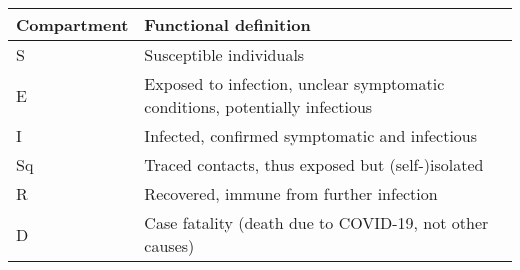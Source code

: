 \documentclass[]{article}
\begin{document}
\begin{longtable}[]{@{}ll@{}}
\toprule
\begin{minipage}[b]{0.11\columnwidth}\raggedright
Compartment\strut
\end{minipage} & \begin{minipage}[b]{0.83\columnwidth}\raggedright
Functional definition\strut
\end{minipage}\tabularnewline
\midrule
\endhead
\begin{minipage}[t]{0.11\columnwidth}\raggedright
S\strut
\end{minipage} & \begin{minipage}[t]{0.83\columnwidth}\raggedright
Susceptible individuals\strut
\end{minipage}\tabularnewline
\begin{minipage}[t]{0.11\columnwidth}\raggedright
E\strut
\end{minipage} & \begin{minipage}[t]{0.83\columnwidth}\raggedright
Exposed to infection, unclear symptomatic conditions, potentially
infectious\strut
\end{minipage}\tabularnewline
\begin{minipage}[t]{0.11\columnwidth}\raggedright
I\strut
\end{minipage} & \begin{minipage}[t]{0.83\columnwidth}\raggedright
Infected, confirmed symptomatic and infectious\strut
\end{minipage}\tabularnewline
\begin{minipage}[t]{0.11\columnwidth}\raggedright
Sq\strut
\end{minipage} & \begin{minipage}[t]{0.83\columnwidth}\raggedright
Traced contacts, thus exposed but (self-)isolated\strut
\end{minipage}\tabularnewline
\begin{minipage}[t]{0.11\columnwidth}\raggedright
R\strut
\end{minipage} & \begin{minipage}[t]{0.83\columnwidth}\raggedright
Recovered, immune from further infection\strut
\end{minipage}\tabularnewline
\begin{minipage}[t]{0.11\columnwidth}\raggedright
D\strut
\end{minipage} & \begin{minipage}[t]{0.83\columnwidth}\raggedright
Case fatality (death due to COVID-19, not other causes)\strut
\end{minipage}\tabularnewline
\bottomrule
\end{longtable}
\end{document}
